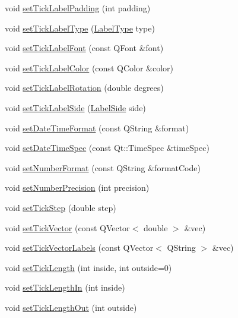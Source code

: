 \begin{DoxyCompactItemize}
void \hyperlink{classQCPAxis_af302c479af9dbc2e9f0e44e07c0012ee}{set\-Tick\-Label\-Padding} (int padding)
\item 
void \hyperlink{classQCPAxis_a54f24f5ce8feea25209388a863d7e448}{set\-Tick\-Label\-Type} (\hyperlink{classQCPAxis_a4a7da0166f755f5abac23b765d184cad}{\-Label\-Type} type)
\item 
void \hyperlink{classQCPAxis_a2b8690c4e8dbc39d9185d2b398ce7a6c}{set\-Tick\-Label\-Font} (const \-Q\-Font \&font)
\item 
void \hyperlink{classQCPAxis_a395e445c3fe496b935bee7b911ecfd1c}{set\-Tick\-Label\-Color} (const \-Q\-Color \&color)
\item 
void \hyperlink{classQCPAxis_a1bddd4413df8a576b7ad4b067fb33375}{set\-Tick\-Label\-Rotation} (double degrees)
\item 
void \hyperlink{classQCPAxis_a13ec644fc6e22715744c92c6dfa4f0fa}{set\-Tick\-Label\-Side} (\hyperlink{classQCPAxis_a24b13374b9b8f75f47eed2ea78c37db9}{\-Label\-Side} side)
\item 
void \hyperlink{classQCPAxis_a2ee0191daa03524a682113e63e05f7a7}{set\-Date\-Time\-Format} (const \-Q\-String \&format)
\item 
void \hyperlink{classQCPAxis_a262e06731debed7eee11fa6a81d67eaf}{set\-Date\-Time\-Spec} (const \-Qt\-::\-Time\-Spec \&time\-Spec)
\item 
void \hyperlink{classQCPAxis_ae585a54dc2aac662e90a2ca82f002590}{set\-Number\-Format} (const \-Q\-String \&format\-Code)
\item 
void \hyperlink{classQCPAxis_a21dc8023ad7500382ad9574b48137e63}{set\-Number\-Precision} (int precision)
\item 
void \hyperlink{classQCPAxis_af727db0acc6492c4c774c0700e738205}{set\-Tick\-Step} (double step)
\item 
void \hyperlink{classQCPAxis_a871db94c5d796c80fcbe1a9d4506e27e}{set\-Tick\-Vector} (const \-Q\-Vector$<$ double $>$ \&vec)
\item 
void \hyperlink{classQCPAxis_a921d3ba3853ca3bd2cce3459f7a243ed}{set\-Tick\-Vector\-Labels} (const \-Q\-Vector$<$ \-Q\-String $>$ \&vec)
\item 
void \hyperlink{classQCPAxis_a62ec40bebe3540e9c1479a8fd2be3b0d}{set\-Tick\-Length} (int inside, int outside=0)
\item 
void \hyperlink{classQCPAxis_afae1a37a99611366275a51204d991739}{set\-Tick\-Length\-In} (int inside)
\item 
void \hyperlink{classQCPAxis_a3b8a0debd1ffedd2c22d0592dfbb4e62}{set\-Tick\-Length\-Out} (int outside)

\end{DoxyCompactItemize}
